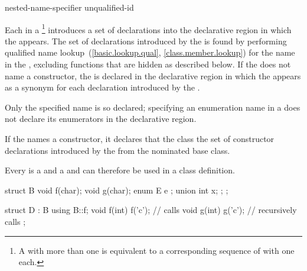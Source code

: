 \begin{bnf}
\br
     nested-name-specifier unqualified-id
\end{bnf}

\pnum
Each  in a %
\footnote{A  with more than one
 is equivalent to a corresponding sequence
of  with
one  each.}
introduces a set of declarations into the declarative region in
which the  appears.
The set of declarations introduced by the  is found by
performing qualified name lookup~(\ref{basic.lookup.qual}, \ref{class.member.lookup})
for the name in the ,
excluding functions that are hidden as described below.
If the  does not name a constructor,
the  is declared in the declarative region
in which the  appears
as a synonym for each declaration introduced by the .
\begin{note} Only the specified name is so declared;
specifying an enumeration name in a 
does not declare its enumerators
in the  declarative region.
\end{note}
%
If the  names a constructor,
it declares that the class  the set of constructor declarations
introduced by the  from the nominated base class.

\pnum
Every  is a  and a
 and can therefore be used in a class definition.
\begin{example}

\begin{codeblock}
struct B {
  void f(char);
  void g(char);
  enum E { e };
  union { int x; };
};

struct D : B {
  using B::f;
  void f(int) { f('c'); }       // calls 
  void g(int) { g('c'); }       // recursively calls 
};
\end{codeblock}
\end{example}

